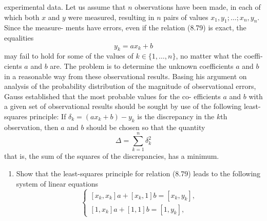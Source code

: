     experimental data.
    Let us assume that $n$ observations have been made, in each of which both $x$ and $y$
    were measured, resulting in $n$ pairs of values $x_1, y_1; \ldots; x_n, y_n$. Since the measure-
    ments have errors, even if the relation (8.79) is exact, the equalities
    \[
    y_k = ax_k + b
    \]
    may fail to hold for some of the values of $k \in \{1, \ldots, n\}$, no matter what the coeffi-
    cients $a$ and $b$ are.
    The problem is to determine the unknown coefficients $a$ and $b$ in a reasonable
    way from these observational results.
    Basing his argument on analysis of the probability distribution of the magnitude
    of observational errors, Gauss established that the most probable values for the co-
    efficients $a$ and $b$ with a given set of observational results should be sought by use
    of the following least-squares principle:
    If $\delta_k = (ax_k + b) - y_k$ is the discrepancy in the $k$th observation, then $a$ and $b$
    should be chosen so that the quantity
    \[
    \Delta = \sum_{k=1}^n \delta_k^2
    \]
    that is, the sum of the squares of the discrepancies, has a minimum.
    \begin{enumerate}
        \item[(a)] Show that the least-squares principle for relation (8.79) leads to the following
        system of linear equations
        \[
        \begin{cases}
        [x_k, x_k]a + [x_k, 1]b = [x_k, y_k], \\
        [1, x_k]a + [1, 1]b = [1, y_k],
        \end{cases}
        \]
    \end{enumerate}